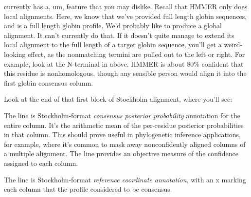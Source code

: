  currently has a, um, feature that you may dislike.
Recall that HMMER only does local alignments. Here, we know that we've
provided full length globin sequences, and  is a full
length globin profile. We'd probably like  to produce a
global alignment. It can't currently do that. If it doesn't quite
manage to extend its local alignment to the full length of a target
globin sequence, you'll get a weird-looking effect, as the nonmatching
termini are pulled out to the left or right. For example, look at the
N-terminal  in  above. HMMER is about 80\%
confident that this residue is nonhomologous, though any sensible
person would align it into the first globin consensus column.

Look at the end of that first block of Stockholm alignment, where you'll
see:


The  line is Stockholm-format \emph{consensus
  posterior probability} annotation for the entire column. It's the
arithmetic mean of the per-residue posterior probabilities in that
column. This should prove useful in phylogenetic inference
applications, for example, where it's common to mask away
nonconfidently aligned columns of a multiple alignment. The
 line provides an objective measure of the confidence
assigned to each column.

The  line is Stockholm-format \emph{reference
  coordinate annotation}, with an x marking each column that the
profile considered to be consensus.




